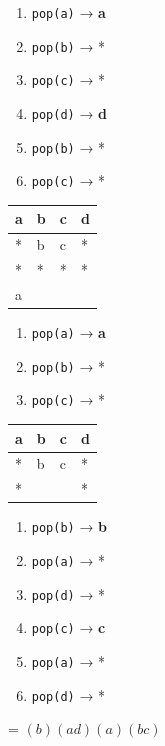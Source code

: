 \documentclass[11pt]{article}
\providecommand{\tightlist}{%
      \setlength{\itemsep}{0pt}\setlength{\parskip}{0pt}}
\begin{document}
\begin{enumerate}
\def\labelenumi{\arabic{enumi}.}
\tightlist
\item
  \texttt{pop(a)} → \textbf{a}
\item
  \texttt{pop(b)} → *
\item
  \texttt{pop(c)} → *
\item
  \texttt{pop(d)} → \textbf{d}
\item
  \texttt{pop(b)} → *
\item
  \texttt{pop(c)} → *
\end{enumerate}

\begin{longtable}[]{@{}llll@{}}
\toprule\noalign{}
a & b & c & d \\
\midrule\noalign{}
\endhead
\bottomrule\noalign{}
\endlastfoot
* & b & c & * \\
* & * & * & * \\
a & & & \\
\end{longtable}

\begin{enumerate}
\def\labelenumi{\arabic{enumi}.}
\tightlist
\item
  \texttt{pop(a)} → \textbf{a}
\item
  \texttt{pop(b)} → *
\item
  \texttt{pop(c)} → *
\end{enumerate}

\begin{longtable}[]{@{}llll@{}}
\toprule\noalign{}
a & b & c & d \\
\midrule\noalign{}
\endhead
\bottomrule\noalign{}
\endlastfoot
* & b & c & * \\
* & & & * \\
\end{longtable}

\begin{enumerate}
\def\labelenumi{\arabic{enumi}.}
\tightlist
\item
  \texttt{pop(b)} → \textbf{b}
\item
  \texttt{pop(a)} → *
\item
  \texttt{pop(d)} → *
\item
  \texttt{pop(c)} → \textbf{c}
\item
  \texttt{pop(a)} → *
\item
  \texttt{pop(d)} → *
\end{enumerate}

= \((b)(ad)(a)(bc)\)
\end{document}
